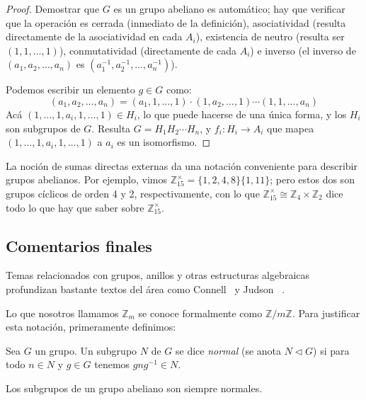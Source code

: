   \begin{proof}
    Demostrar que \(G\) es un grupo abeliano es automático;
    hay que verificar
    que la operación es cerrada (inmediato de la definición),
    asociatividad (resulta directamente de la asociatividad en cada \(A_i\)),
    existencia de neutro (resulta ser \((1, 1, \dotsc, 1)\)),
    conmutatividad (directamente de cada \(A_i\))
    e inverso
    (el inverso de \((a_1, a_2, \dotsc, a_n)\)
     es \((a_1^{-1}, a_2^{-1}, \dotsc, a_n^{-1})\)).

    Podemos escribir un elemento \(g \in G\) como:
    \begin{equation*}
      (a_1, a_2, \dotsc, a_n)
	 = (a_1, 1, \dotsc, 1) \cdot
	   (1, a_2, \dotsc, 1) \dotsm
	   (1, 1, \dotsc, a_n)
    \end{equation*}
    Acá \((1, \dotsc, 1, a_i, 1, \dotsc, 1) \in H_i\),
    lo que puede hacerse de una única forma,
    y los \(H_i\) son subgrupos de \(G\).
    Resulta \(G = H_1 H_2 \dotsb H_n\),
    y \(f_i \colon H_i \rightarrow A_i\)
    que mapea \((1,  \dotsc, 1, a_i, 1, \dotsc, 1)\) a \(a_i\)
    es un isomorfismo.
  \end{proof}

  La noción de sumas directas externas
  da una notación conveniente para describir grupos abelianos.
  Por ejemplo,
  vimos \(\mathbb{Z}^\times_{15} = \{1, 2, 4, 8\} \{1, 11\}\);
  pero estos dos son grupos cíclicos de orden 4 y 2, respectivamente,
  con lo que \(\mathbb{Z}^\times_{15} \cong \mathbb{Z}_4 \times \mathbb{Z}_2\)
  dice todo lo que hay que saber sobre \(\mathbb{Z}^\times_{15}\).

\subsection{Comentarios finales}
\label{sec:Zm-comentarios}

  Temas relacionados con grupos,
  anillos y otras estructuras algebraicas
  profundizan bastante textos del área como Connell~%
    \cite{connell04:_elemen_abstr_linear_algeb}
  y Judson~%
    \cite{judson14:_abstr_algeb}.

  Lo que nosotros llamamos \(\mathbb{Z}_m\)
  se conoce formalmente como \(\mathbb{Z} / m \mathbb{Z}\).
  Para justificar esta notación,
  primeramente definimos:
  \begin{definition}
    Sea \(G\) un grupo.
    Un subgrupo \(N\) de \(G\)
    se dice \emph{normal}
    (se anota \(N \lhd G\))
    si para todo \(n \in N\) y \(g \in G\)
    tenemos \(g n g^{-1} \in N\).
  \end{definition}
  Los subgrupos de un grupo abeliano son siempre normales.

